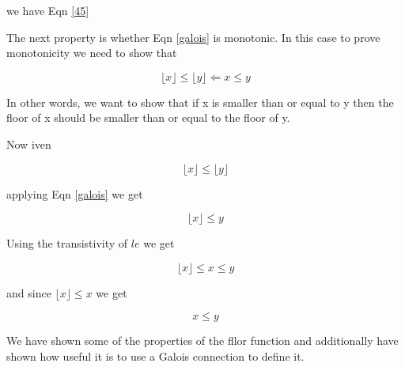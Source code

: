 \documentclass[10pt,a4paper]{article}
\providecommand{\floor}[1]{\lfloor #1 \rfloor  }
\begin{document}
we have Eqn \ref{45}


The next property is whether Eqn \ref{galois} is monotonic. In this case to prove monotonicity we need to show that

\begin{equation}
 \floor{x} \le \floor{y} \Leftarrow x \le y
\end{equation}

In other words, we want to show that if x is smaller than or equal to y then the floor of x should be smaller than or equal to the floor of y.

Now iven

\begin{equation}
 \floor{x} \le \floor{y}
\end{equation}

applying Eqn \ref{galois} we get

\begin{equation}
 \floor{x} \le y
\end{equation}

Using the transistivity of $le$ we get

\begin{equation}
 \floor{x}\le x\le y
\end{equation}

and since $\floor{x} \le x$ we get

\begin{equation}
 x\le y
\end{equation}

We have shown some of the properties of the fllor function and additionally have shown how useful it is to use a Galois connection to define it.
\end{document}
